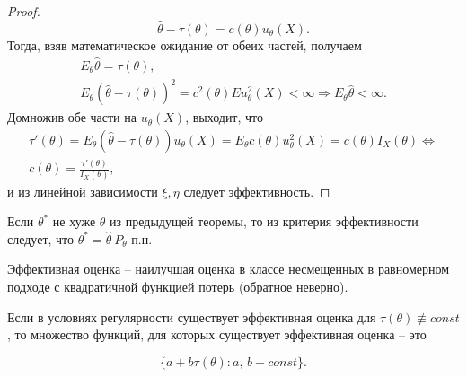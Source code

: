 \begin{proof}
\begin{equation*}
\hat{\theta } -\tau ( \theta ) =c( \theta ) u_{\theta }( X) .
\end{equation*}
Тогда, взяв математическое ожидание от обеих частей, получаем
\begin{gather*}
E_{\theta }\hat{\theta } =\tau ( \theta ) ,\\
E_{\theta }(\hat{\theta } -\tau ( \theta ))^{2} =c^{2}( \theta ) Eu_{\theta }^{2}( X) < \infty \Rightarrow E_{\theta }\hat{\theta } < \infty .
\end{gather*}
Домножив обе части на $\displaystyle u_{\theta }( X)$, выходит, что
\begin{gather*}
\tau '( \theta ) =E_{\theta }(\hat{\theta } -\tau ( \theta )) u_{\theta }( X) =E_{\theta } c( \theta ) u_{\theta }^{2}( X) =c( \theta ) I_{X}( \theta ) \Leftrightarrow \\
c( \theta ) =\frac{\tau '( \theta )}{I_{X}( \theta )} ,
\end{gather*}
и из линейной зависимости $\displaystyle \xi ,\eta $ следует эффективность.
\end{proof}
\begin{corollary}
Если $\displaystyle \theta ^{*}$ не хуже $\displaystyle \theta $ из предыдущей теоремы, то из критерия эффективности следует, что $\displaystyle \theta ^{*} =\hat{\theta } \ P_{\theta }$-п.н.
\end{corollary}
\begin{note}
Эффективная оценка -- наилучшая оценка в классе несмещенных в равномерном подходе с квадратичной функцией потерь (обратное неверно).
\end{note}
\begin{theorem}
Если в условиях регулярности существует эффективная оценка для $\displaystyle \tau ( \theta ) \nequiv const$, то множество функций, для которых существует эффективная оценка -- это


\begin{equation*}
\{a+b\tau ( \theta ):a,\, b-const\} .
\end{equation*}
\end{theorem}
